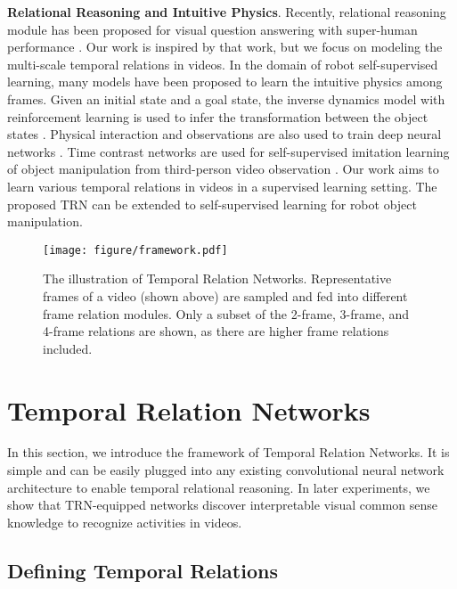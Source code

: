 \documentclass[runningheads]{llncs}
\begin{document}
\textbf{Relational Reasoning and Intuitive Physics}. Recently, relational reasoning module has been proposed for visual question answering with super-human performance \cite{santoro2017simple}. Our work is inspired by that work, but we focus on modeling the multi-scale temporal relations in videos. In the domain of robot self-supervised learning, many models have been proposed to learn the intuitive physics among frames. Given an initial state and a goal state, the inverse dynamics model with reinforcement learning is used to infer the transformation between the object states \cite{agrawal2016learning}. Physical interaction and observations are also used to train deep neural networks \cite{pinto2016curious}. Time contrast networks are used for self-supervised imitation learning of object manipulation from third-person video observation \cite{sermanet2017time}. Our work aims to learn various temporal relations in videos in a supervised learning setting. The proposed TRN can be extended to self-supervised learning for robot object manipulation. 

\begin{figure*}
\vspace{-7mm}
\texttt{[image: figure/framework.pdf]}
\vspace{-5mm}
\caption{The illustration of Temporal Relation Networks. Representative frames of a video (shown above) are sampled and fed into different frame relation modules. Only a subset of the 2-frame, 3-frame, and 4-frame relations are shown, as there are higher frame relations included.}
\label{illustration}
\vspace{-8mm}
\end{figure*}

\section{Temporal Relation Networks}

In this section, we introduce the framework of Temporal Relation Networks. It is simple and can be easily plugged into any existing convolutional neural network architecture to enable temporal relational reasoning. In later experiments, we show that TRN-equipped networks discover interpretable visual common sense knowledge to recognize activities in videos.

\subsection{Defining Temporal Relations}
\end{document}
